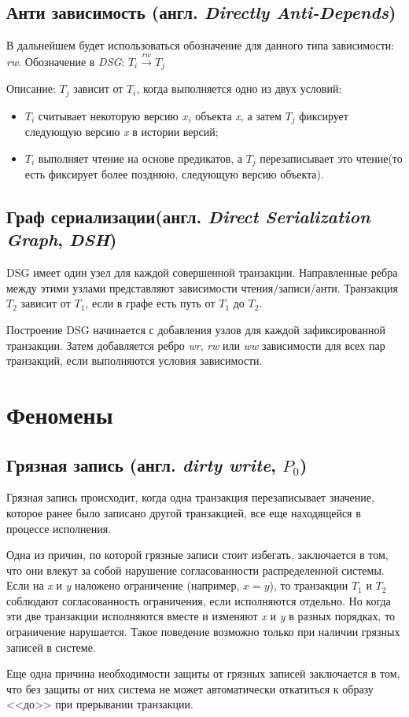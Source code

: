 \documentclass[12pt,  openany]{book}
\begin{document}
\subsection{Анти зависимость (англ. \textit{Directly Anti-Depends})}
В дальнейшем будет использоваться обозначение для данного типа зависимости: \textit{rw}. Обозначение в \textit{DSG}: $T_i  \xrightarrow{\textit{rw}} T_j$
\par
Описание: $T_j$ зависит от $T_i$,  когда выполняется одно из двух условий:
\begin{itemize}
\item $T_i$ считывает некоторую версию $x_i$ объекта \textit{x}, а затем $T_j$  фиксирует следующую версию \textit{x} в истории версий;
\item $T_i$ выполняет чтение на основе предикатов, а $T_j$ перезаписывает это чтение(то есть фиксирует более позднюю, следующую версию  объекта).
\end{itemize}

\subsection{Граф сериализации(англ. \textit{Direct Serialization Graph}, \textit{DSH})}
DSG имеет один узел для каждой совершенной транзакции. Направленные ребра между этими узлами представляют зависимости чтения/записи/анти. Транзакция $T_2$ зависит от $T_1$, если в графе есть путь от $T_1$ до $T_2$. 
\par
Построение DSG начинается с добавления узлов для каждой зафиксированной транзакции. Затем добавляется ребро \textit{wr}, \textit{rw} или \textit{ww} зависимости для всех пар транзакций, если выполняются условия зависимости.

\section{Феномены}
\subsection{Грязная запись (англ.  \textit{dirty write}, $P_0$) \cite{CritiqueANSI_SQL}}
Грязная запись происходит, когда одна транзакция перезаписывает значение, которое ранее было записано другой транзакцией, все еще находящейся в процессе исполнения.
\par Одна из причин, по которой грязные записи стоит избегать, заключается в том, что они влекут за собой нарушение согласованности распределенной системы.  Если на \textit{x} и \textit{y} наложено ограничение (например, $x = y$), то транзакции $T_1$ и $T_2$ соблюдают согласованность ограничения, если исполняются отдельно.  Но когда эти две транзакции исполняются вместе и изменяют \textit{x} и \textit{y} в разных порядках, то ограничение нарушается.  Такое поведение возможно только при наличии грязных записей в системе.
\par Еще одна причина необходимости защиты от грязных записей заключается в том, что без защиты от них система не может автоматически откатиться к образу <<до>> при прерывании транзакции.
\end{document}
